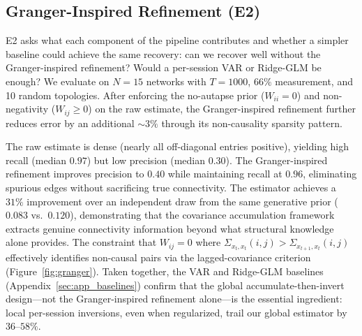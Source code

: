 \documentclass{article}
\begin{document}
\subsection{Granger-Inspired Refinement (E2)}

E2 asks what each component of the pipeline contributes and whether a simpler baseline could achieve the same recovery: can we recover well without the Granger-inspired refinement? Would a per-session VAR or Ridge-GLM be enough?
We evaluate on $N=15$ networks with $T=1000$, $66\%$ measurement, and 10 random topologies.
After enforcing the no-autapse prior ($W_{ii} = 0$) and non-negativity ($W_{ij} \geq 0$) on the raw estimate, the Granger-inspired refinement further reduces error by an additional $\sim 3\%$ through its non-causality sparsity pattern.

The raw estimate is dense (nearly all off-diagonal entries positive), yielding high recall (median $0.97$) but low precision (median $0.30$).
The Granger-inspired refinement improves precision to $0.40$ while maintaining recall at $0.96$, eliminating spurious edges without sacrificing true connectivity.
The estimator achieves a $31\%$ improvement over an independent draw from the same generative prior ($0.083$ vs.\ $0.120$), demonstrating that the covariance accumulation framework extracts genuine connectivity information beyond what structural knowledge alone provides.
The constraint that $W_{ij} = 0$ where $\Sigma_{x_t, x_t}(i,j) > \Sigma_{x_{t+1}, x_t}(i,j)$ effectively identifies non-causal pairs via the lagged-covariance criterion (Figure~\ref{fig:granger}).
Taken together, the VAR and Ridge-GLM baselines (Appendix~\ref{sec:app_baselines}) confirm that the global accumulate-then-invert design---not the Granger-inspired refinement alone---is the essential ingredient: local per-session inversions, even when regularized, trail our global estimator by $36$--$58\%$.
\end{document}
